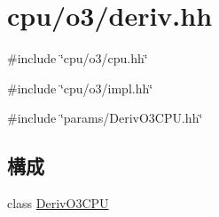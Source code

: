 \hypertarget{deriv_8hh}{
\section{cpu/o3/deriv.hh}
\label{deriv_8hh}
}
{\ttfamily \#include \char`\"{}cpu/o3/cpu.hh\char`\"{}}\par
{\ttfamily \#include \char`\"{}cpu/o3/impl.hh\char`\"{}}\par
{\ttfamily \#include \char`\"{}params/DerivO3CPU.hh\char`\"{}}\par
\subsection*{構成}
\begin{DoxyCompactItemize}
\item 
class \hyperlink{classDerivO3CPU}{DerivO3CPU}
\end{DoxyCompactItemize}
